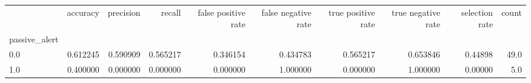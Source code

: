 \begin{tabular}{lrrrrrrrrr}
\toprule
{} &  accuracy &  precision &    recall &  false positive rate &  false negative rate &  true positive rate &  true negative rate &  selection rate &  count \\
passive\_alert &           &            &           &                      &                      &                     &                     &                 &        \\
\midrule
0.0           &  0.612245 &   0.590909 &  0.565217 &             0.346154 &             0.434783 &            0.565217 &            0.653846 &         0.44898 &   49.0 \\
1.0           &  0.400000 &   0.000000 &  0.000000 &             0.000000 &             1.000000 &            0.000000 &            1.000000 &         0.00000 &    5.0 \\
\bottomrule
\end{tabular}
